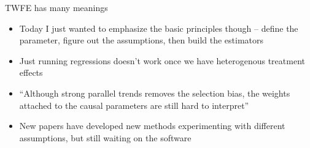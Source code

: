 \documentclass{beamer}
\begin{document}
\begin{frame}{TWFE has many meanings}

\begin{itemize}

\item Today I just wanted to emphasize the basic principles though -- define the parameter, figure out the assumptions, then build the estimators
\item Just running regressions doesn't work once we have heterogenous treatment effects
\item ``Although strong parallel trends removes the selection bias, the weights attached to the causal parameters are still hard to interpret''
\item New papers have developed new methods experimenting with different assumptions, but still waiting on the software
\end{itemize}

\end{frame}
\end{document}
